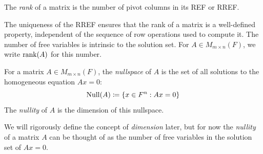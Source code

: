 \documentclass[../linear_algebra_and_groups.tex]{subfiles}
\begin{document}
\begin{definition}[Rank]
    \begin{shaded*}
        The \textit{rank} of a matrix is the number of pivot columns in its REF or RREF.
    \end{shaded*}
\end{definition}

\begin{remark}
    The uniqueness of the RREF ensures that the rank of a matrix is a well-defined property, independent of the sequence of row operations used to compute it. The number of free variables is intrinsic to the solution set. For $A\in M_{m\times n}(F)$, we write $\operatorname{rank}(A)$ for this number.
\end{remark}

\begin{definition}
    \begin{shaded*}
        For a matrix $A \in M_{m\times n}(F)$, the \textit{nullspace} of $A$ is the set of all solutions to the homogeneous equation $Ax=0$:
        \[ \operatorname{Null}(A) \coloneqq \{x \in F^n : Ax = 0\} \]
        The \textit{nullity} of $A$ is the dimension of this nullspace.
    \end{shaded*}
\end{definition}
\begin{remark}
    We will rigorously define the concept of \textit{dimension} later, but for now the \textit{nullity} of a matrix $A$ can be thought of as the number of free variables in the solution set of $Ax=0$.
\end{remark}
\end{document}
